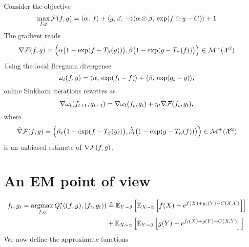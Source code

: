 \documentclass[a4paper, 10pt]{article}
\begin{document}
Consider the objective
\begin{equation}
    \max_{f, g} \mathcal{F}(f, g) = \langle \alpha,\,f\rangle + \langle g, \beta,\,-\rangle
     \langle \alpha \otimes \beta,\,\exp(f \oplus g - C)\rangle + 1
\end{equation}
The gradient reads
\begin{equation}
    \nabla \mathcal{F}(f, g) = \Big(\alpha\big(1 - \exp(f - T_\beta(g))\big), \beta\big(1 - \exp(g - T_\alpha(f))\big)\Big)
     \in \mathcal{M}^+(\mathcal{X}^2)
\end{equation}
Using the local Bregman divergence
\begin{equation}
    \omega_t(f, g) = \langle \alpha,\,\exp(f_t - f)\rangle + \langle \beta,\,\exp(g_t - g)\rangle,
\end{equation}
online Sinkhorn iterations rewrites as
\begin{equation}
    \nabla \omega_t(f_{t+1}, g_{t+1}) = \nabla \omega_t(f_t, g_t) + \eta_t \tilde \nabla \mathcal{F}(f_t, g_t),
\end{equation}
where 
\begin{equation}
    \tilde \nabla \mathcal{F}(f, g) = \Big(\hat \alpha_t \big(1 - \exp(f - T_\beta(g))\big), 
    \hat \beta_t \big(1 - \exp(g - T_\alpha(f))\big)\Big)
    \in \mathcal{M}^+(\mathcal{X}^2)
\end{equation}
is an unbiased estimate of $\nabla \mathcal{F}(f, g)$.

\section{An EM point of view}

\begin{align}
    f_t, g_t = \operatorname*{argmax}_{f, g} Q_t^\star((f, g), (f_t, g_t)) 
    &\triangleq \mathbb{E}_{Y \sim \beta} \left[ \mathbb{E}_{X \sim \alpha} \left[
     f(X) - e^{f(X) + g_t(Y) - C(X, Y)} \right] \right] \\
     &+
     \mathbb{E}_{X \sim \alpha} \left[ \mathbb{E}_{Y \sim \beta} \left[
     g(Y) - e^{f_t(X) + g(Y) - C(X, Y)} \right] \right]
\end{align}
We now define the approximate functions
\end{document}
